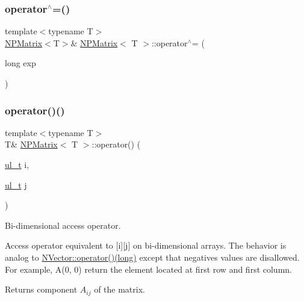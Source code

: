 \subsubsection{\texorpdfstring{operator$^\wedge$=()}{operator^=()}}
{\footnotesize\ttfamily template$<$typename T$>$ \\
\mbox{\hyperlink{class_n_p_matrix}{N\+P\+Matrix}}$<$T$>$\& \mbox{\hyperlink{class_n_p_matrix}{N\+P\+Matrix}}$<$ T $>$\+::operator$^\wedge$= (\begin{DoxyParamCaption}\item[{long}]{exp }\end{DoxyParamCaption})\hspace{0.3cm}{\ttfamily [inline]}}

\mbox{\label{class_n_p_matrix_a437ba12a96e979b50f6d579400b20f6f}} 
\subsubsection{\texorpdfstring{operator()()}{operator()()}\hspace{0.1cm}{\footnotesize\ttfamily [1/4]}}
{\footnotesize\ttfamily template$<$typename T$>$ \\
T\& \mbox{\hyperlink{class_n_p_matrix}{N\+P\+Matrix}}$<$ T $>$\+::operator() (\begin{DoxyParamCaption}\item[{\mbox{\hyperlink{typedef_8h_a1b140a2034db3f5dfe18a987745df43a}{ul\+\_\+t}}}]{i,  }\item[{\mbox{\hyperlink{typedef_8h_a1b140a2034db3f5dfe18a987745df43a}{ul\+\_\+t}}}]{j }\end{DoxyParamCaption})\hspace{0.3cm}{\ttfamily [inline]}}



Bi-\/dimensional access operator. 

Access operator equivalent to {\ttfamily \mbox{[}i\mbox{]}\mbox{[}j\mbox{]}} on bi-\/dimensional arrays. The behavior is analog to {\ttfamily \mbox{\hyperlink{class_n_vector_a3ed21b63fd97af9c63bfacb372f733a5}{N\+Vector\+::operator()(long)}}} except that negatives values are disallowed. For example, {\ttfamily A(0, 0)} return the element located at first row and first column. \begin{DoxyReturn}{Returns}
component $ A_{ij} $ of the matrix. 
\end{DoxyReturn}
\mbox{\label{class_n_p_matrix_aa512abe782fac9e6b0d2eb1167df4133}} 
